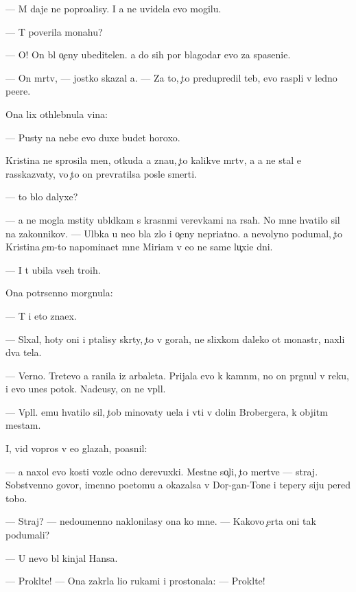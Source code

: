 \documentclass[10pt]{book}
\begin{document}
— M{\yi} daje ne popro{\x}alisy. I {\y}a ne uvidela {\y}evo mogilu.

— T{\yi} poverila monahu?

— O! On b{\yi}l o{\c}eny ubeditelen. {\Y}a do sih por blagodar{\iu} {\y}evo za spaseni{\y}e.

— On m{\e}rtv, — jostko skazal {\y}a. — Za to, {\c}to predupredil teb{\ia}, {\y}evo rasp{\ia}li v led{\ia}no{\y} pe{\x}ere.

Ona lix othlebnula vina:

— Pusty na nebe {\y}evo duxe budet horoxo.

Kristina ne sprosila men{\ia}, otkuda {\y}a zna{\y}u, {\c}to kalikve{\q} m{\e}rtv, a {\y}a ne stal {\y}e{\y} rasskaz{\yi}vaty, vo {\c}to on prevratilsa posle smerti.

— {\C}to b{\yi}lo dalyxe?

— {\Y}a ne mogla mstity ubl{\iu}dkam s krasn{\yi}mi verevkami na r{\ia}sah. No mne hvatilo sil na zakonnikov. — Ul{\yi}bka u ne{\y}o b{\yi}la zlo{\y} i o{\c}eny nepri{\y}atno{\y}. {\Y}a nevolyno podumal, {\c}to Kristina {\c}em-to napomina{\y}et mne Miriam v {\y}e{\y}o ne sam{\yi}{\y}e lu{\c}xi{\y}e dni.

— I t{\yi} ubila vseh tro{\y}ih.

Ona potr{\ia}senno morgnula:

— T{\yi} i eto zna{\y}ex.

— Sl{\yi}xal, hoty oni i p{\yi}talisy skr{\yi}ty, {\c}to v gorah, ne slixkom daleko ot monast{\yi}r{\ia}, naxli dva tela.

— Verno. Tret{\y}evo {\y}a ranila iz arbaleta. Prijala {\y}evo k kamn{\ia}m, no on pr{\yi}gnul v reku, i {\y}evo unes potok. Nade{\y}usy, on ne v{\yi}pl{\yi}l.

— V{\yi}pl{\yi}l. {\Y}emu hvatilo sil, {\c}tob{\yi} minovaty u{\x}el{\y}a i v{\yi}{\y}ti v dolin{\yi} Brobergera, k objit{\yi}m mestam.

I, vid{\ia} vopros v {\y}e{\y}o glazah, po{\y}asnil:

— {\Y}a naxol {\y}evo kosti vozle odno{\y} derevuxki. Mestn{\yi}{\y}e so{\c}li, {\c}to mertve{\q} — straj. Sobstvenno govor{\ia}, imenno poetomu {\y}a okazalsa v Dor{\c}-gan-To{\y}ne i tepery siju pered tobo{\y}.

— Straj? — nedoumenno naklonilasy ona ko mne. — Kakovo {\c}erta oni tak podumali?

— U nevo b{\yi}l kinjal Hansa.

— Prokl{\ia}t{\y}e! — Ona zakr{\yi}la li{\q}o rukami i prostonala: — Prokl{\ia}t{\y}e!
\end{document}
